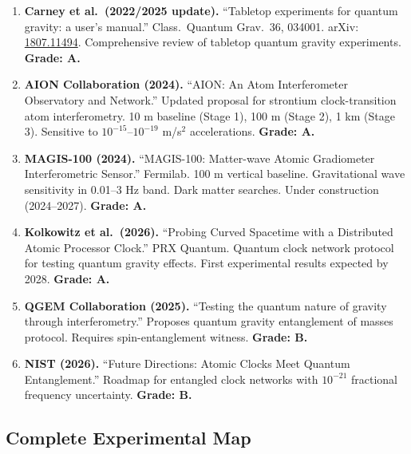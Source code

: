 \documentclass[11pt,a4paper]{article}
\begin{document}
\begin{enumerate}
\item \textbf{Carney et al.\ (2022/2025 update).} ``Tabletop experiments for quantum gravity: a user's manual.'' Class.\ Quantum Grav.\ 36, 034001. arXiv: \href{https://arxiv.org/abs/1807.11494}{1807.11494}. Comprehensive review of tabletop quantum gravity experiments. \textbf{Grade: A.}

\item \textbf{AION Collaboration (2024).} ``AION: An Atom Interferometer Observatory and Network.'' Updated proposal for strontium clock-transition atom interferometry. 10 m baseline (Stage 1), 100 m (Stage 2), 1 km (Stage 3). Sensitive to $10^{-15}$--$10^{-19}$ m/s$^2$ accelerations. \textbf{Grade: A.}

\item \textbf{MAGIS-100 (2024).} ``MAGIS-100: Matter-wave Atomic Gradiometer Interferometric Sensor.'' Fermilab. 100 m vertical baseline. Gravitational wave sensitivity in 0.01--3 Hz band. Dark matter searches. Under construction (2024--2027). \textbf{Grade: A.}

\item \textbf{Kolkowitz et al.\ (2026).} ``Probing Curved Spacetime with a Distributed Atomic Processor Clock.'' PRX Quantum. Quantum clock network protocol for testing quantum gravity effects. First experimental results expected by 2028. \textbf{Grade: A.}

\item \textbf{QGEM Collaboration (2025).} ``Testing the quantum nature of gravity through interferometry.'' Proposes quantum gravity entanglement of masses protocol. Requires spin-entanglement witness. \textbf{Grade: B.}

\item \textbf{NIST (2026).} ``Future Directions: Atomic Clocks Meet Quantum Entanglement.'' Roadmap for entangled clock networks with $10^{-21}$ fractional frequency uncertainty. \textbf{Grade: B.}
\end{enumerate}

\subsection{Complete Experimental Map}
\end{document}
